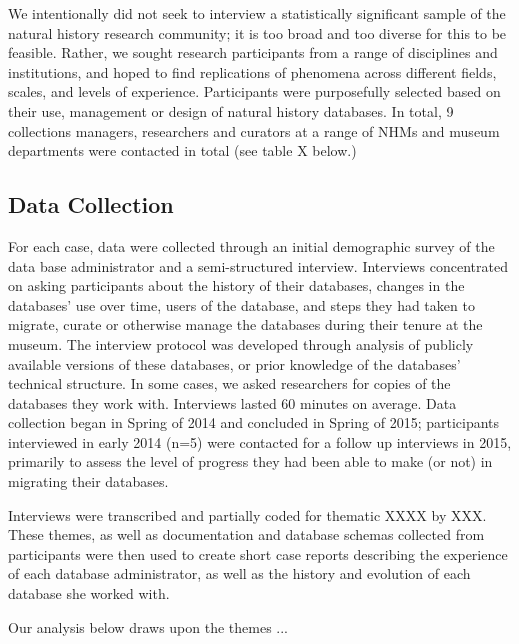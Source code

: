 We intentionally did not seek to interview a statistically significant sample of the natural history research community; it is too broad and too diverse for this to be feasible.  Rather, we sought research participants from a range of disciplines and institutions, and hoped to find replications of phenomena across different fields, scales, and levels of experience. Participants were purposefully selected based on their use, management or design of natural history databases. In total, 9 collections managers, researchers and curators at a range of NHMs and museum departments were contacted in total (see table X below.) 

\subsection{Data Collection}
For each case, data were collected through an initial demographic survey of the data base administrator and a semi-structured interview.  Interviews concentrated on asking participants about the history of their databases, changes in the databases’ use over time, users of the database, and steps they had taken to migrate, curate or otherwise manage the databases during their tenure at the museum. The interview protocol was developed through analysis of publicly available versions of these databases, or prior knowledge of the databases’ technical structure. In some cases, we asked researchers for copies of the databases they work with. Interviews lasted 60 minutes on average.  Data collection began in Spring of 2014 and concluded in Spring of 2015; participants interviewed in early 2014 (n=5) were contacted for a follow up interviews in 2015, primarily to assess the level of progress they had been able to make (or not) in migrating their databases.

Interviews were transcribed and partially coded for thematic XXXX by XXX. These themes, as well as documentation and database schemas collected from participants were then used to create short case reports describing the experience of each database administrator, as well as  the history and evolution of each database she worked with.  

Our analysis below draws upon the themes ... 
